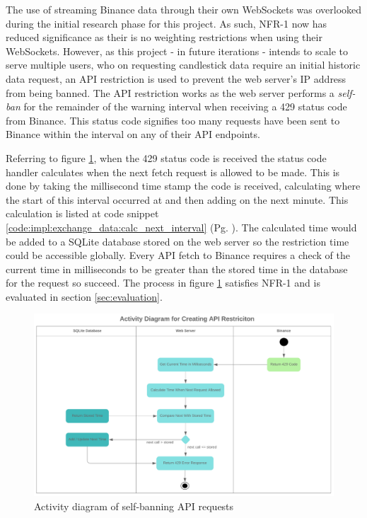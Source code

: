 The use of streaming Binance data through their own WebSockets was overlooked during the initial research phase for this project. As such, NFR-1 now has reduced significance as their is no weighting restrictions when using their WebSockets. However, as this project - in future iterations - intends to scale to serve multiple users, who on requesting candlestick data require an initial historic data request, an API restriction is used to prevent the web server's IP address from being banned. The API restriction works as the web server performs a \textit{self-ban} for the remainder of the warning interval when receiving a 429 status code from Binance. This status code signifies too many requests have been sent to Binance within the interval on any of their API endpoints.

Referring to figure \ref{fig:implementation:AD_API_RESTRICT}, when the 429 status code is received the status code handler calculates when the next fetch request is allowed to be made. This is done by taking the millisecond time stamp the code is received, calculating where the start of this interval occurred at and then adding on the next minute. This calculation is listed at code snippet \ref{code:impl:exchange_data:calc_next_interval} (Pg. \pageref{code:impl:exchange_data:calc_next_interval}). The calculated time would be added to a SQLite database stored on the web server so the restriction time could be accessible globally. Every API fetch to Binance requires a check of the current time in milliseconds to be greater than the stored time in the database for the request so succeed. The process in figure \ref{fig:implementation:AD_API_RESTRICT} satisfies NFR-1 and is evaluated in section \ref{sec:evaluation}.

\begin{figure}[!htb]
    \centering
	\includegraphics[width=\textwidth]{content/graphics/diagrams/AD_set_api_ban.png}
	\caption{Activity diagram of self-banning API requests}
	\label{fig:implementation:AD_API_RESTRICT}
\end{figure}

